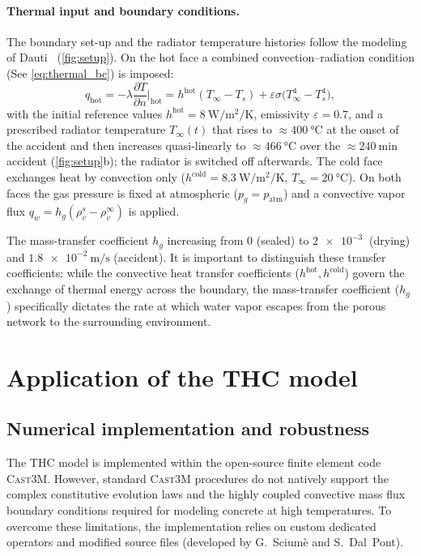 \paragraph{Thermal input and boundary conditions.} The boundary set-up and the radiator temperature histories follow the modeling of Dauti~\cite{dauti2018} (\cref{fig:setup}). On the hot face a combined convection--radiation condition (See \cref{eq:thermal_bc}) is imposed:
\begin{equation}
    q_{\mathrm{hot}} = -\lambda \frac{\partial T}{\partial n}\Big|_{\mathrm{hot}} = h^{\mathrm{hot}}(T_\infty - T_s) + \varepsilon \sigma \big(T_\infty^4 - T_s^4\big),
    \label{eq:heated-face}
\end{equation}
with the initial reference values $h^{\mathrm{hot}}=\SI{8}{\watt\per\meter\squared\per\kelvin}$, emissivity $\varepsilon=0.7$, and a prescribed radiator temperature $T_\infty(t)$ that rises to $\approx\SI{400}{\celsius}$ at the onset of the accident and then increases quasi-linearly to $\approx\SI{466}{\celsius}$ over the $\approx\SI{240}{\minute}$ accident (\cref{fig:setup}b); the radiator is switched off afterwards. The cold face exchanges heat by convection only ($h^{\mathrm{cold}}=\SI{8.3}{\watt\per\meter\squared\per\kelvin}$, $T_\infty=\SI{20}{\celsius}$). On both faces the gas pressure is fixed at atmospheric ($p_g=p_{\mathrm{atm}}$) and a convective vapor flux $q_w=h_g(\rho_{v}^{s}-\rho_{v}^{\infty})$ is applied.

The mass-transfer coefficient $h_g$ increasing from $0$ (sealed) to $\SI{2e-3}{}$ (drying) and $\SI{1.8e-2}{\meter\per\second}$ (accident). It is important to distinguish these transfer coefficients: while the convective heat transfer coefficients ($h^{\mathrm{hot}}, h^{\mathrm{cold}}$) govern the exchange of thermal energy across the boundary, the mass-transfer coefficient ($h_g$) specifically dictates the rate at which water vapor escapes from the porous network to the surrounding environment.
 
\section{Application of the THC model} \label{sec:thc-application}

\subsection{Numerical implementation and robustness} \label{sec:robustness}
The THC model is implemented within the open-source finite element code \textsc{Cast3M}. However, standard \textsc{Cast3M} procedures do not natively support the complex constitutive evolution laws and the highly coupled convective mass flux boundary conditions required for modeling concrete at high temperatures. To overcome these limitations, the implementation relies on custom dedicated operators and modified source files (developed by G.~Sciumè and S.~Dal~Pont). 

